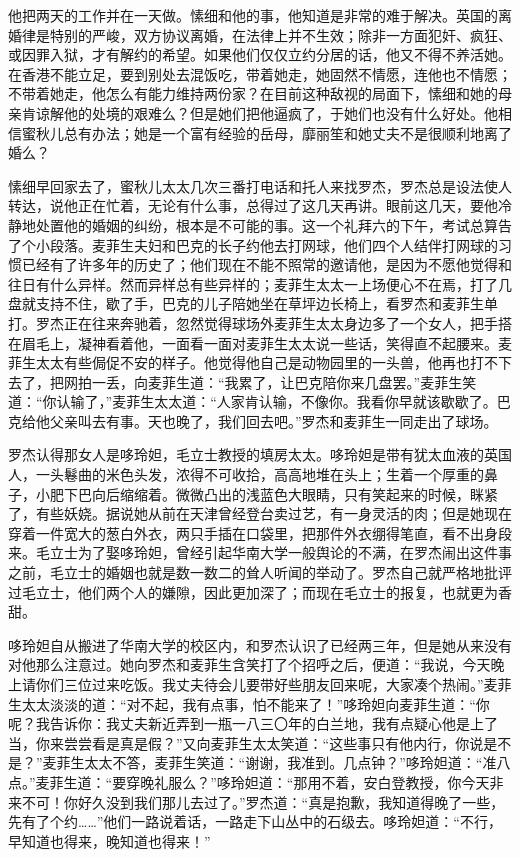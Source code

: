 \par 他把两天的工作并在一天做。愫细和他的事，他知道是非常的难于解决。英国的离婚律是特别的严峻，双方协议离婚，在法律上并不生效；除非一方面犯奸、疯狂、或因罪入狱，才有解约的希望。如果他们仅仅立约分居的话，他又不得不养活她。在香港不能立足，要到别处去混饭吃，带着她走，她固然不情愿，连他也不情愿；不带着她走，他怎么有能力维持两份家？在目前这种敌视的局面下，愫细和她的母亲肯谅解他的处境的艰难么？但是她们把他逼疯了，于她们也没有什么好处。他相信蜜秋儿总有办法；她是一个富有经验的岳母，靡丽笙和她丈夫不是很顺利地离了婚么？
\par 愫细早回家去了，蜜秋儿太太几次三番打电话和托人来找罗杰，罗杰总是设法使人转达，说他正在忙着，无论有什么事，总得过了这几天再讲。眼前这几天，要他冷静地处置他的婚姻的纠纷，根本是不可能的事。这一个礼拜六的下午，考试总算告了个小段落。麦菲生夫妇和巴克的长子约他去打网球，他们四个人结伴打网球的习惯已经有了许多年的历史了；他们现在不能不照常的邀请他，是因为不愿他觉得和往日有什么异样。然而异样总有些异样的；麦菲生太太一上场便心不在焉，打了几盘就支持不住，歇了手，巴克的儿子陪她坐在草坪边长椅上，看罗杰和麦菲生单打。罗杰正在往来奔驰着，忽然觉得球场外麦菲生太太身边多了一个女人，把手搭在眉毛上，凝神看着他，一面看一面对麦菲生太太说一些话，笑得直不起腰来。麦菲生太太有些侷促不安的样子。他觉得他自己是动物园里的一头兽，他再也打不下去了，把网拍一丢，向麦菲生道：“我累了，让巴克陪你来几盘罢。”麦菲生笑道：“你认输了，”麦菲生太太道：“人家肯认输，不像你。我看你早就该歇歇了。巴克给他父亲叫去有事。天也晚了，我们回去吧。”罗杰和麦菲生一同走出了球场。
\par 罗杰认得那女人是哆玲妲，毛立士教授的填房太太。哆玲妲是带有犹太血液的英国人，一头鬈曲的米色头发，浓得不可收拾，高高地堆在头上；生着一个厚重的鼻子，小肥下巴向后缩缩着。微微凸出的浅蓝色大眼睛，只有笑起来的时候，眯紧了，有些妖娆。据说她从前在天津曾经登台卖过艺，有一身灵活的肉；但是她现在穿着一件宽大的葱白外衣，两只手插在口袋里，把那件外衣绷得笔直，看不出身段来。毛立士为了娶哆玲妲，曾经引起华南大学一般舆论的不满，在罗杰闹出这件事之前，毛立士的婚姻也就是数一数二的耸人听闻的举动了。罗杰自己就严格地批评过毛立士，他们两个人的嫌隙，因此更加深了；而现在毛立士的报复，也就更为香甜。
\par 哆玲妲自从搬进了华南大学的校区内，和罗杰认识了已经两三年，但是她从来没有对他那么注意过。她向罗杰和麦菲生含笑打了个招呼之后，便道：“我说，今天晚上请你们三位过来吃饭。我丈夫待会儿要带好些朋友回来呢，大家凑个热闹。”麦菲生太太淡淡的道：“对不起，我有点事，怕不能来了！”哆玲妲向麦菲生道：“你呢？我告诉你：我丈夫新近弄到一瓶一八三〇年的白兰地，我有点疑心他是上了当，你来尝尝看是真是假？”又向麦菲生太太笑道：“这些事只有他内行，你说是不是？”麦菲生太太不答，麦菲生笑道：“谢谢，我准到。几点钟？”哆玲妲道：“准八点。”麦菲生道：“要穿晚礼服么？”哆玲妲道：“那用不着，安白登教授，你今天非来不可！你好久没到我们那儿去过了。”罗杰道：“真是抱歉，我知道得晚了一些，先有了个约……”他们一路说着话，一路走下山丛中的石级去。哆玲妲道：“不行，早知道也得来，晚知道也得来！”
